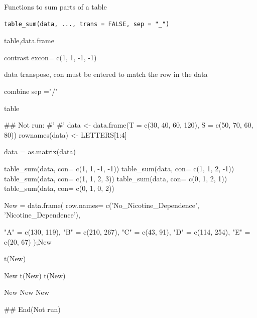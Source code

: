 \documentclass[a4paper]{book}
\begin{document}
%
\begin{Description}
Functions to sum parts of a table
\end{Description}
%
\begin{Usage}
\begin{verbatim}
table_sum(data, ..., trans = FALSE, sep = "_")
\end{verbatim}
\end{Usage}
%
\begin{Arguments}
\begin{ldescription}
\item[\code{data}] table,data.frame

\item[\code{...}] contrast excon= c(1, 1, -1, -1)

\item[\code{trans}] data transpose, con must be entered to match the row in the data

\item[\code{sep}] combine sep ="/'
\end{ldescription}
\end{Arguments}
%
\begin{Value}
table
\end{Value}
%
\begin{Examples}
\begin{ExampleCode}

\#\# Not run: 
#'
#'
data <- data.frame(T = c(30, 40, 60, 120),
                   S = c(50, 70, 60, 80))
rownames(data) <- LETTERS[1:4]

data = as.matrix(data)


table_sum(data, con= c(1, 1, -1, -1))
table_sum(data, con= c(1, 1, 2, -1))
table_sum(data, con= c(1, 1, 2, 3))
table_sum(data, con= c(0, 1, 2, 1))
table_sum(data, con= c(0, 1, 0, 2))

New = data.frame(
  row.names= c('No_Nicotine_Dependence', 'Nicotine_Dependence'),

  "A" = c(130, 119),
  "B" = c(210, 267),
  "C" = c(43, 91),
  "D" = c(114, 254),
  "E" = c(20, 67)
);New

t(New)%

New %
t(New)
t(New)%

New%
New%
New%


## End(Not run)


\end{ExampleCode}
\end{Examples}
\end{document}
